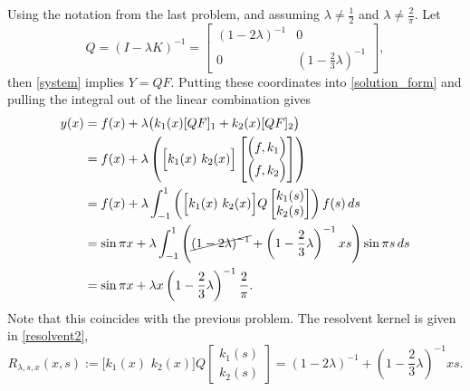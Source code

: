 \documentclass{homework}
\begin{document}
\begin{solution}
  Using the notation from the last problem, and assuming $\lambda \not= \frac 12$ and  $\lambda\not= \frac 2\pi$. Let
  \begin{equation}
  \renewcommand{\arraystretch}{1.4}
    Q = (I - \lambda K)^{-1} = 
     \begin{bmatrix}
	(1-2\lambda)^{-1}  & 0 \\
	0  & (1 - \frac 23\lambda)^{-1} 
     \end{bmatrix},
  \end{equation}
  then \eqref{system} implies $Y = QF$. Putting these coordinates into \eqref{solution_form} and pulling the integral out of the linear combination gives
  \begin{align}
    y(x) 
    &= f(x) + \lambda\big(k_1(x)[QF]_1 + k_2(x)[QF]_2\big) \nonumber\\
    &= f(x) + \lambda\left(
      \Big[ k_1(x) \,\, k_2(x) \Big]
      \begin{bmatrix}
       \Big(f,k_1\Big) \\
       \Big(f,k_2\Big) 
      \end{bmatrix} 
    \right) \nonumber\\
    &= f(x) + \lambda \int_{-1}^1 
    \left(
      \Big[ k_1(x) \,\, k_2(x) \Big]
      Q
      \begin{bmatrix}
       k_1(s) \\
       k_2(s) 
      \end{bmatrix} 
    \right)f(s)\,ds  \label{resolvent2}\\
    &= \sin \pi x + \lambda \int_{-1}^1 \left(\cancel{(1-2\lambda)^{-1}} + \left(1-\frac 23\lambda\right)^{-1}xs \right) \sin \pi s\, ds \nonumber \\
    &= \sin \pi x + \lambda x \left(1-\frac 23\lambda\right)^{-1} \frac 2\pi. \nonumber 
  \end{align}
  Note that this coincides with the previous problem.  The resolvent kernel is given in \eqref{resolvent2},
  $$
      R_{\lambda,s,x}(x,s):=\Big[ k_1(x) \,\, k_2(x) \Big]
      Q
      \begin{bmatrix}
       k_1(s) \\
       k_2(s) 
      \end{bmatrix} 
      = (1-2\lambda)^{-1} + \left(1-\frac 23\lambda\right)^{-1}xs.
  $$

\end{solution}
\end{document}
